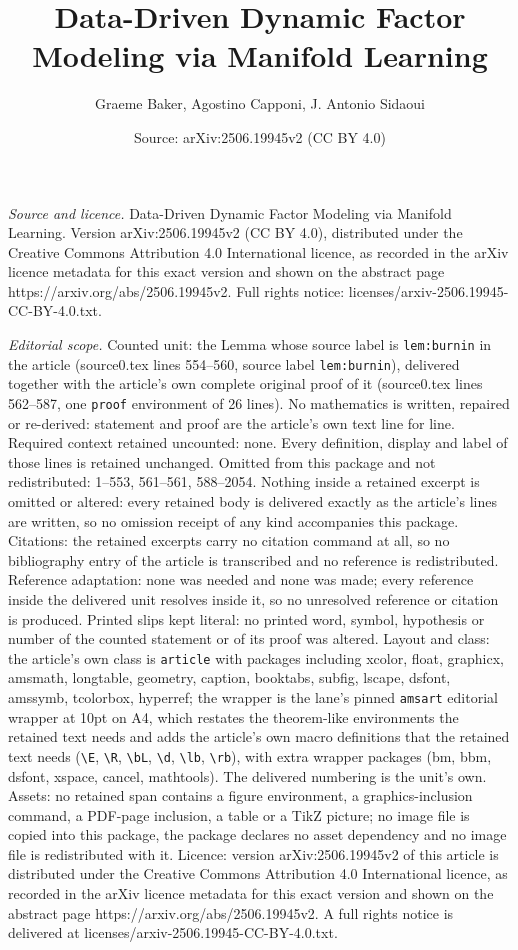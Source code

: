 \documentclass[10pt,a4paper]{amsart}
\title[Data-Driven Dynamic Factor Modeling via Manifold Learning]{Data-Driven Dynamic Factor Modeling via Manifold Learning}
\author{Graeme Baker, Agostino Capponi, J. Antonio Sidaoui}
\date{Source: arXiv:2506.19945v2 (CC BY 4.0)}
\begin{document}
\maketitle

\noindent\emph{Source and licence.} Data-Driven Dynamic Factor Modeling via Manifold Learning. Version arXiv:2506.19945v2 (CC BY 4.0), distributed under the Creative Commons Attribution 4.0 International licence, as recorded in the arXiv licence metadata for this exact version and shown on the abstract page https://arxiv.org/abs/2506.19945v2. Full rights notice: licenses/arxiv-2506.19945-CC-BY-4.0.txt.\par\smallskip

\noindent\textit{Editorial scope.} Counted unit: the Lemma whose source label is \texttt{lem:burnin} in the article (source0.tex lines 554--560, source label \texttt{lem:burnin}), delivered together with the article's own complete original proof of it (source0.tex lines 562--587, one \texttt{proof} environment of 26 lines). No mathematics is written, repaired or re-derived: statement and proof are the article's own text line for line. Required context retained uncounted: none. Every definition, display and label of those lines is retained unchanged. Omitted from this package and not redistributed: 1--553, 561--561, 588--2054. Nothing inside a retained excerpt is omitted or altered: every retained body is delivered exactly as the article's lines are written, so no omission receipt of any kind accompanies this package. Citations: the retained excerpts carry no citation command at all, so no bibliography entry of the article is transcribed and no reference is redistributed. Reference adaptation: none was needed and none was made; every reference inside the delivered unit resolves inside it, so no unresolved reference or citation is produced. Printed slips kept literal: no printed word, symbol, hypothesis or number of the counted statement or of its proof was altered. Layout and class: the article's own class is \texttt{article} with packages including xcolor, float, graphicx, amsmath, longtable, geometry, caption, booktabs, subfig, lscape, dsfont, amssymb, tcolorbox, hyperref; the wrapper is the lane's pinned \texttt{amsart} editorial wrapper at 10pt on A4, which restates the theorem-like environments the retained text needs and adds the article's own macro definitions that the retained text needs (\texttt{\textbackslash E}, \texttt{\textbackslash R}, \texttt{\textbackslash bL}, \texttt{\textbackslash d}, \texttt{\textbackslash lb}, \texttt{\textbackslash rb}), with extra wrapper packages (bm, bbm, dsfont, xspace, cancel, mathtools). The delivered numbering is the unit's own. Assets: no retained span contains a figure environment, a graphics-inclusion command, a PDF-page inclusion, a table or a TikZ picture; no image file is copied into this package, the package declares no asset dependency and no image file is redistributed with it. Licence: version arXiv:2506.19945v2 of this article is distributed under the Creative Commons Attribution 4.0 International licence, as recorded in the arXiv licence metadata for this exact version and shown on the abstract page https://arxiv.org/abs/2506.19945v2. A full rights notice is delivered at licenses/arxiv-2506.19945-CC-BY-4.0.txt. 
\end{document}
